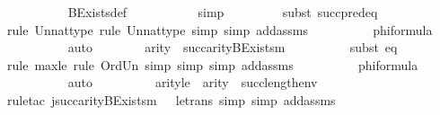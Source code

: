 \begin{isabellebody}
\ \ \ \ \ \ \ \ \isamarkupfalse%
\ BExists{\isacharprime}{\kern0pt}{\isacharunderscore}{\kern0pt}def\ \isanewline
\ \ \ \ \ \ \ \ \isamarkupfalse%
\ simp\isanewline
\ \ \ \ \ \ \ \ \isamarkupfalse%
{\isacharparenleft}{\kern0pt}subst\ succ{\isacharunderscore}{\kern0pt}pred{\isacharunderscore}{\kern0pt}eq{\isacharparenright}{\kern0pt}\isanewline
\ \ \ \ \ \ \ \ \isamarkupfalse%
{\isacharparenleft}{\kern0pt}rule\ Un{\isacharunderscore}{\kern0pt}nat{\isacharunderscore}{\kern0pt}type{\isacharcomma}{\kern0pt}\ rule\ Un{\isacharunderscore}{\kern0pt}nat{\isacharunderscore}{\kern0pt}type{\isacharcomma}{\kern0pt}\ simp{\isacharcomma}{\kern0pt}\ simp\ add{\isacharcolon}{\kern0pt}assms{}{\isacharparenright}{\kern0pt}\isanewline
\ \ \ \ \ \ \ \ \isamarkupfalse%
\ phiformula\ \isanewline
\ \ \ \ \ \ \ \ \isamarkupfalse%
\ auto\isanewline
\ \ \ \ \ \ \isamarkupfalse%
\ {\isachardoublequoteopen}arity{\isacharparenleft}{\kern0pt}{\isasymphi}{\isacharparenright}{\kern0pt}\ {\isasymle}\ succ{\isacharparenleft}{\kern0pt}arity{\isacharparenleft}{\kern0pt}BExists{\isacharprime}{\kern0pt}{\isacharparenleft}{\kern0pt}m{\isacharcomma}{\kern0pt}\ {\isasymphi}{\isacharparenright}{\kern0pt}{\isacharparenright}{\kern0pt}{\isacharparenright}{\kern0pt}{\isachardoublequoteclose}\isanewline
\ \ \ \ \ \ \ \ \isamarkupfalse%
{\isacharparenleft}{\kern0pt}subst\ eq{\isacharparenright}{\kern0pt}\ \isanewline
\ \ \ \ \ \ \ \ \isamarkupfalse%
{\isacharparenleft}{\kern0pt}rule\ max{\isacharunderscore}{\kern0pt}le{}{\isacharcomma}{\kern0pt}\ rule\ Ord{\isacharunderscore}{\kern0pt}Un{\isacharcomma}{\kern0pt}\ simp{\isacharcomma}{\kern0pt}\ simp{\isacharcomma}{\kern0pt}\ simp\ add{\isacharcolon}{\kern0pt}assms{}{\isacharparenright}{\kern0pt}\isanewline
\ \ \ \ \ \ \ \ \isamarkupfalse%
\ phiformula\ \isanewline
\ \ \ \ \ \ \ \ \isamarkupfalse%
\ auto\isanewline
\ \ \ \ \ \ \isamarkupfalse%
\ \isamarkupfalse%
\ arityle{\isacharcolon}{\kern0pt}\ \ {\isachardoublequoteopen}arity{\isacharparenleft}{\kern0pt}{\isasymphi}{\isacharparenright}{\kern0pt}\ {\isasymle}\ succ{\isacharparenleft}{\kern0pt}length{\isacharparenleft}{\kern0pt}env{\isacharparenright}{\kern0pt}{\isacharparenright}{\kern0pt}{\isachardoublequoteclose}\ \isanewline
\ \ \ \ \ \ \ \ \isamarkupfalse%
{\isacharparenleft}{\kern0pt}rule{\isacharunderscore}{\kern0pt}tac\ j{\isacharequal}{\kern0pt}{\isachardoublequoteopen}succ{\isacharparenleft}{\kern0pt}arity{\isacharparenleft}{\kern0pt}BExists{\isacharprime}{\kern0pt}{\isacharparenleft}{\kern0pt}m{\isacharcomma}{\kern0pt}\ {\isasymphi}{\isacharparenright}{\kern0pt}{\isacharparenright}{\kern0pt}{\isacharparenright}{\kern0pt}{\isachardoublequoteclose}\ \ le{\isacharunderscore}{\kern0pt}trans{\isacharcomma}{\kern0pt}\ simp{\isacharcomma}{\kern0pt}\ simp\ add{\isacharcolon}{\kern0pt}assms{}{\isacharparenright}{\kern0pt}\isanewline

\end{isabellebody}
